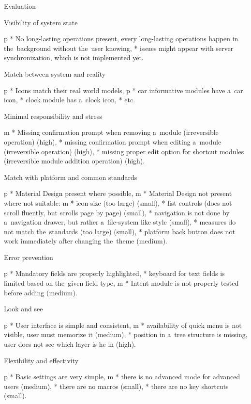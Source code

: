 \secc Evaluation

\seccc Visibility of system state

\begitems \style p 
* No long-lasting operations present, every long-lasting operations happen in the~background without the~user knowing,
* issues might appear with server synchronization, which is not implemented yet.
\enditems

\seccc Match between system and reality

\begitems \style p
* Icons match their real world models,
  \begitems \style p
  * car informative modules have a~car icon,
  * clock module has a~clock icon,
  * etc.
  \enditems
\enditems

\seccc Minimal responsibility and stress

\begitems \style m
* Missing confirmation prompt when removing a~module (irreversible operation) (high),
* missing confirmation prompt when editing a~module (irreversible operation) (high),
* missing proper edit option for shortcut modules (irreversible module addition operation) (high).
\enditems

\seccc Match with platform and common standards

\begitems \style p
* Material Design present where possible,
\style m
* Material Design not present where not suitable:
  \begitems \style m
  * icon size (too large) (small),
  * list controls (does not scroll fluently, but scrolls page by page) (small),
  * navigation is not done by a~navigation drawer, but rather a~file-system like style (small),
  * measures do not match the~standards (too large) (small),
  * platform back button does not work immediately after changing the~theme (medium).
  \enditems
\enditems

\seccc Error prevention

\begitems \style p
* Mandatory fields are properly highlighted,
* keyboard for text fields is limited based on the~given field type,
\style m
* Intent module is not properly tested before adding (medium).
\enditems

\seccc Look and see

\begitems
\style p
* User interface is simple and consistent,
\style m
* availability of quick menu is not visible, user must memorize it (medium),
* position in a~tree structure is missing, user does not see which layer is he in (high). 
\enditems

\seccc Flexibility and effectivity

\begitems
\style p
* Basic settings are very simple,
\style m
* there is no advanced mode for advanced users (medium),
* there are no macros (small),
* there are no key shortcuts (small).
\enditems

